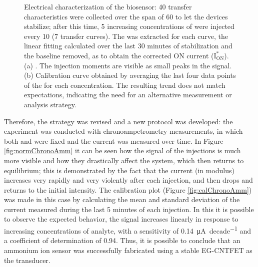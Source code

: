 \begin{figure}[]
    \centering
    \hfill
    \caption{Electrical characterization of the biosensor: 40 transfer characteristics were collected over the span of \SI{60}{\min} to let the devices stabilize; after this time, 5 increasing concentrations of \amm{} were injected every \SI{10}{\min} (7 transfer curves). The \ion{} was extracted for each curve, the linear fitting calculated over the last 30 minutes of stabilization and the baseline removed, as to obtain the corrected ON current ($\mathrm{I_{ON}^*}$).
    (a) \ioncorr{}. The injection moments are visible as small peaks in the signal.
    (b) Calibration curve obtained by averaging the last four data points of the \ioncorr{} for each concentration. The resulting trend does not match expectations, indicating the need for an alternative measurement or analysis strategy.}
    \label{fig:transferAmm}
\end{figure}

Therefore, the strategy was revised and a new protocol was developed: the experiment was conducted with chronoampetrometry measurements, in which both \vds{} and \vgs{} were fixed and the current was measured over time. In Figure \ref{fig:normChronoAmm} it can be seen how the signal of the injections is much more visible and how they drastically affect the system, which then returns to equilibrium; this is demonstrated by the fact that the current (in modulus) increases very rapidly and very violently after each injection, and then drops and returns to the initial intensity. The calibration plot (Figure \ref{fig:calChronoAmm}) was made in this case by calculating the mean and standard deviation of the current measured during the last 5 minutes of each injection. In this it is possible to observe the expected behavior, \ie{} the signal increases linearly in response to increasing concentrations of analyte, with a sensitivity of \SI{0.14}{\uA \per decade} and a coefficient of determination of 0.94. Thus, it is possible to conclude that an ammonium ion sensor was successfully fabricated using a stable EG-CNTFET as the transducer.

